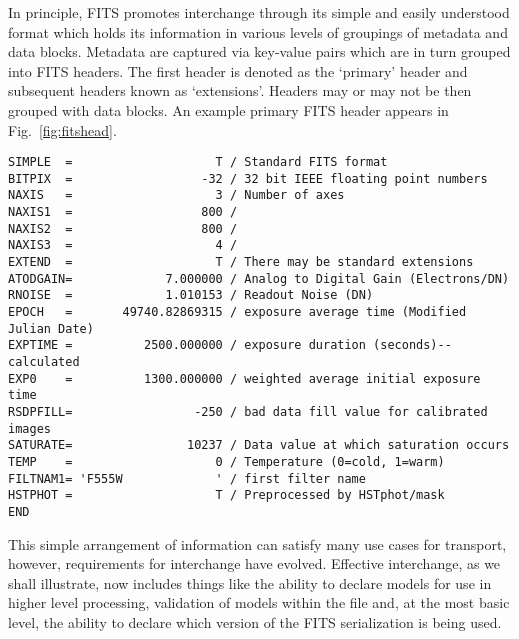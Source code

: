 \documentclass[final,authoryear,5p,times,twocolumn]{elsarticle}
\begin{document}
{{In principle, FITS promotes interchange through its simple and easily
understood format which holds its information in various levels of groupings
of metadata and data blocks. Metadata are captured via key-value pairs which
are in turn grouped into FITS headers. The first header is denoted as the
`primary' header and subsequent headers known as `extensions'. Headers may or
may not be then grouped with data blocks.  An example primary FITS header
appears in Fig.~\ref{fig:fitshead}.


\begin{figure*}
\begin{minipage}{\textwidth}
\begin{verbatim}
SIMPLE  =                    T / Standard FITS format
BITPIX  =                  -32 / 32 bit IEEE floating point numbers
NAXIS   =                    3 / Number of axes
NAXIS1  =                  800 /
NAXIS2  =                  800 /
NAXIS3  =                    4 /
EXTEND  =                    T / There may be standard extensions
ATODGAIN=             7.000000 / Analog to Digital Gain (Electrons/DN)
RNOISE  =             1.010153 / Readout Noise (DN)
EPOCH   =       49740.82869315 / exposure average time (Modified Julian Date)
EXPTIME =          2500.000000 / exposure duration (seconds)--calculated
EXP0    =          1300.000000 / weighted average initial exposure time
RSDPFILL=                 -250 / bad data fill value for calibrated images
SATURATE=                10237 / Data value at which saturation occurs
TEMP    =                    0 / Temperature (0=cold, 1=warm)
FILTNAM1= 'F555W             ' / first filter name
HSTPHOT =                    T / Preprocessed by HSTphot/mask
END
\end{verbatim}
\caption{Representative simple primary header of a FITS file showing
  an assortment of FITS keywords and their associated values. This
  header from 1995 uses a definition of the, now deprecated,
  \texttt{EPOCH} keyword that is at odds with the standard usage of
  the period but the lack of parsable units for the field make it
  hard for a computer parser to understand this.
  Bytes which contain data may or may not follow the \texttt{END} keyword of
  the header.}
\label{fig:fitshead}
\end{minipage}
\end{figure*}


This simple arrangement of information can satisfy many use cases for
transport, however, requirements for interchange have evolved. Effective
interchange, as we shall illustrate, now includes things like the ability to
declare models for use in higher level processing, validation of models within
the file and, at the most basic level, the ability to declare which version of
the FITS serialization is being used.


}}
\end{document}
